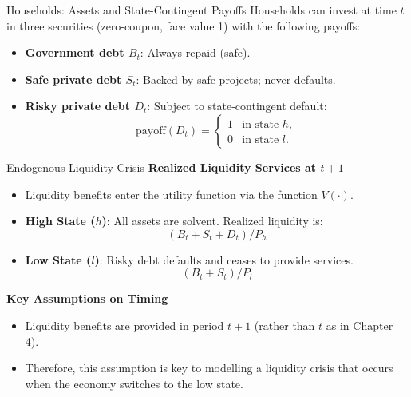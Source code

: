 \documentclass[11pt,aspectratio=169]{beamer}
\begin{document}
\begin{frame}{Households: Assets and State-Contingent Payoffs}
\small
Households can invest at time $t$ in three securities (zero-coupon, face value 1) with the following payoffs:
\begin{itemize}
  \item \textbf{Government debt $B_t$}: Always repaid (safe).
  \item \textbf{Safe private debt $S_t$}: Backed by safe projects; never defaults.
  \item \textbf{Risky private debt $D_t$}: Subject to state-contingent default:
  \begin{equation*}
    \text{payoff}(D_t) = 
    \begin{cases} 
      1 & \text{in state } h, \\ 
      0 & \text{in state } l. 
    \end{cases}
  \end{equation*}
\end{itemize}
\end{frame}

\begin{frame}{Endogenous Liquidity Crisis}
\small
\textbf{Realized Liquidity Services at $t+1$}
\begin{itemize}
  \item Liquidity benefits enter the utility function via the function $V(\cdot)$.
  \item \textbf{High State ($h$)}: All assets are solvent. Realized liquidity is:
  \[ (B_t + S_t + D_t) / P_h \]
  \item \textbf{Low State ($l$)}: Risky debt defaults and ceases to provide services.
  \[(B_t + S_t) / P_l \]
\end{itemize}
\vspace{0.3cm}
\textbf{Key Assumptions on Timing}
\begin{itemize}
  \item Liquidity benefits are provided in period \textbf{$t+1$} (rather than $t$ as in Chapter 4).
  \item Therefore, this
assumption is key to modelling a liquidity crisis that occurs when the
economy switches to the low state.
\end{itemize}
\end{frame}
\end{document}
